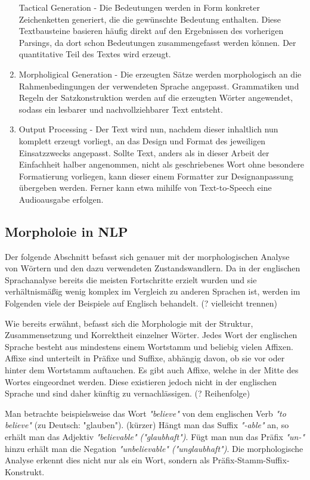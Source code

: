 \documentclass[12pt]{paper}
\begin{document}
\begin{enumerate}
Tactical Generation - Die Bedeutungen werden in Form konkreter Zeichenketten generiert, die die gewünschte Bedeutung enthalten. Diese Textbausteine basieren häufig direkt auf den Ergebnissen des vorherigen Parsings, da dort schon Bedeutungen zusammengefasst werden können. Der quantitative Teil des Textes wird erzeugt.
\item
Morpholigical Generation - Die erzeugten Sätze werden morphologisch an die Rahmenbedingungen der verwendeten Sprache angepasst. Grammatiken und Regeln der Satzkonstruktion werden auf die erzeugten Wörter angewendet, sodass ein lesbarer und nachvollziehbarer Text entsteht.
\item
Output Processing - Der Text wird nun, nachdem dieser inhaltlich nun komplett erzeugt vorliegt, an das Design und Format des jeweiligen Einsatzzwecks angepasst. Sollte Text, anders als in dieser Arbeit der Einfachheit halber angenommen, nicht als geschriebenes Wort ohne besondere Formatierung vorliegen, kann dieser einem Formatter zur Designanpassung übergeben werden. Ferner kann etwa mihilfe von Text-to-Speech eine Audioausgabe erfolgen. 
\end{enumerate}

\subsection{Morpholoie in NLP}
Der folgende Abschnitt befasst sich genauer mit der morphologischen Analyse von Wörtern und den dazu verwendeten Zustandswandlern. Da in der englischen Sprachanalyse bereits die meisten Fortschritte erzielt wurden und sie verhältnismäßig wenig komplex im Vergleich zu anderen Sprachen ist, werden im Folgenden viele der Beispiele auf Englisch behandelt. (? vielleicht trennen)

Wie bereits erwähnt, befasst sich die Morphologie mit der Struktur, Zusammensetzung und Korrektheit einzelner Wörter. Jedes Wort der englischen Sprache besteht aus mindestens einem Wortstamm und beliebig vielen Affixen. Affixe sind unterteilt in Präfixe und Suffixe, abhängig davon, ob sie vor oder hinter dem Wortstamm auftauchen. Es gibt auch Affixe, welche in der Mitte des Wortes eingeordnet werden. Diese existieren jedoch nicht in der englischen Sprache und sind daher künftig zu vernachlässigen. (? Reihenfolge)

Man betrachte beispielsweise das Wort \textit{"believe"} von dem englischen Verb \textit{"to believe"} (zu Deutsch: "glauben"). (kürzer) Hängt man das Suffix \textit{"-able"} an, so erhält man das Adjektiv \textit{"believable" ("glaubhaft")}. Fügt man nun das Präfix \textit{"un-"} hinzu erhält man die Negation \textit{"unbelievable" ("unglaubhaft")}. Die morphologische Analyse erkennt dies nicht nur als ein Wort, sondern als Präfix-Stamm-Suffix-Konstrukt.
\end{document}
